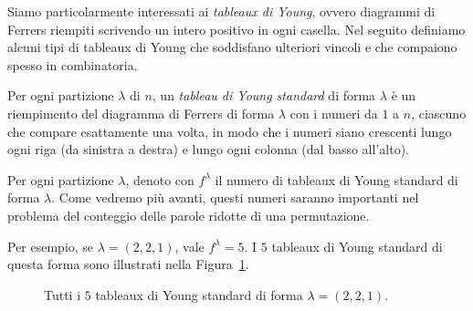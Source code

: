 Siamo particolarmente interessati ai \emph{tableaux di Young}, ovvero
diagrammi di Ferrers riempiti scrivendo un intero positivo in ogni casella.
Nel seguito definiamo alcuni tipi di tableaux di Young che soddisfano 
ulteriori vincoli e che compaiono spesso in combinatoria.

\begin{definition}[Tableau di Young standard]
    Per ogni partizione $\lambda$ di $n$,
    un \emph{tableau di Young standard} di forma $\lambda$ \`e un riempimento
    del diagramma di Ferrers di forma $\lambda$ con i numeri da $1$ a $n$, ciascuno
    che compare esattamente una volta, in modo che i numeri siano crescenti lungo ogni
    riga (da sinistra a destra) e lungo ogni colonna (dal basso all'alto).

    Per ogni partizione $\lambda$, denoto con $f^\lambda$ il numero di tableaux di
    Young standard di forma $\lambda$.
    Come vedremo pi\`u avanti, questi numeri saranno importanti nel problema del
    conteggio delle parole ridotte di una permutazione.
\end{definition}

\begin{example}
    Per esempio, se $\lambda = (2, 2, 1)$, vale $f^\lambda = 5$. 
    I $5$ tableaux di Young standard di questa forma sono illustrati nella
    Figura~\ref{fig:ex_syt}.

    \begin{figure}[htbp]
        \centering
        \qquad
        \qquad
        \qquad
        \qquad
        \caption{Tutti i $5$ tableaux di Young standard di forma $\lambda = (2, 2, 1)$.}
        \label{fig:ex_syt}
    \end{figure}
\end{example}


